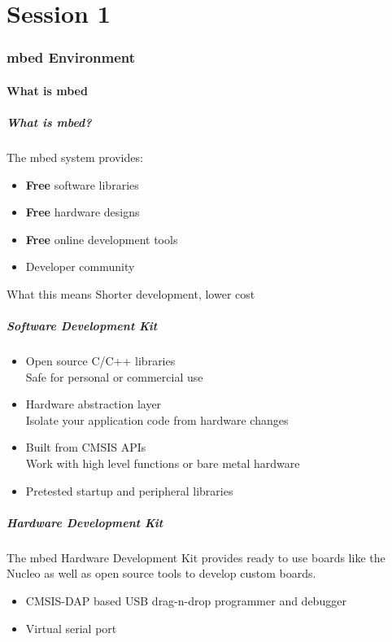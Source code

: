 \part{Session 1}

\section{mbed Environment}
\subsection{What is mbed}
\begin{frame}
	\frametitle{What is mbed?}
	The mbed system provides:
	\begin{itemize}
		\item \textbf{Free} software libraries
		\item \textbf{Free} hardware designs
		\item \textbf{Free} online development tools
		\item Developer community
	\end{itemize}
	\begin{block}{What this means}
		Shorter development, lower cost
	\end{block}
\end{frame}

\begin{frame}
	\frametitle{Software Development Kit}
	\begin{itemize}
		\item Open source C/C++ libraries\\
			Safe for personal or commercial use
		\item Hardware abstraction layer\\
			Isolate your application code from hardware changes
		\item Built from CMSIS APIs\\
			Work with high level functions or bare metal hardware
		\item Pretested startup and peripheral libraries
	\end{itemize}
\end{frame}

\begin{frame}
	\frametitle{Hardware Development Kit}
	The mbed Hardware Development Kit provides ready to use boards like the Nucleo as well as open source tools to develop custom boards.
	\begin{itemize}
		\item CMSIS-DAP based USB drag-n-drop programmer and debugger
		\item Virtual serial port
	\end{itemize}
\end{frame}

